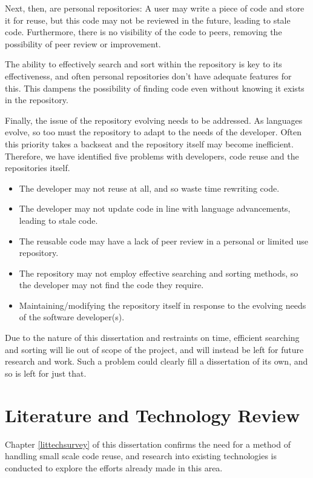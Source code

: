 Next, then, are personal repositories: A user may write a piece of code and store it for reuse, but this code may not be reviewed in the future, leading to stale code. 
Furthermore, there is no visibility of the code to peers, removing the possibility of peer review or improvement.

The ability to effectively search and sort within the repository is key to its effectiveness, and often personal repositories don’t have adequate features for this.
This dampens the possibility of finding code even without knowing it exists in the repository.

Finally, the issue of the repository evolving needs to be addressed. 
As languages evolve, so too must the repository to adapt to the needs of the developer. 
Often this priority takes a backseat and the repository itself may become inefficient. 
Therefore, we have identified five problems with developers, code reuse and the repositories itself.

\begin{itemize}
\item The developer may not reuse at all, and so waste time rewriting code.
\item The developer may not update code in line with language advancements, leading to stale code. 
\item The reusable code may have a lack of peer review in a personal or limited use repository.
\item The repository may not employ effective searching and sorting methods, so the developer may not find the code they require.
\item Maintaining/modifying the repository itself in response to the evolving needs of the software developer(s). 
\end{itemize}

Due to the nature of this dissertation and restraints on time, efficient searching and sorting will lie out of scope of the project, and will instead be left for future research and work.
Such a problem could clearly fill a dissertation of its own, and so is left for just that.

\section{Literature and Technology Review}
Chapter \ref{littechsurvey} of this dissertation confirms the need for a method of handling small scale code reuse, and research into existing technologies is conducted to explore the efforts already made in this area.

